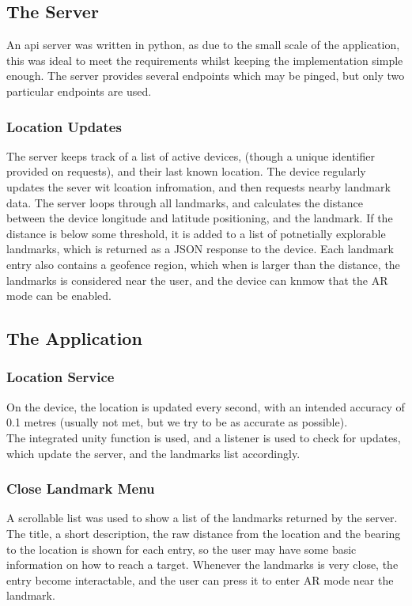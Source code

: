 
\subsection{The Server}
An api server was written in python, as due to the small scale of the application, this was ideal to meet the requirements whilst keeping the 
implementation simple enough. The server provides several endpoints which may be pinged, but only two particular endpoints are used. 
\subsubsection{Location Updates}
The server keeps track of a list of active devices, (though a unique identifier provided on requests), and their last known location.
The device regularly updates the sever wit lcoation infromation, and then requests nearby landmark data. 
The server loops through all landmarks, and calculates the distance between the device longitude and latitude positioning, and the landmark.
If the distance is below some threshold, it is added to a list of potnetially explorable landmarks, which is returned as a JSON response 
to the device. Each landmark entry also contains a geofence region, which when is larger than the distance, the landmarks is considered near 
the user, and the device can knmow that the AR mode can be enabled.
\subsection{The Application}
\subsubsection{Location Service}
On the device, the location is updated every second, with an intended accuracy of 0.1 metres 
(usually not met, but we try to be as accurate as possible).\\
The integrated unity function is used, and a listener is used to check for updates, which update the server,
and the landmarks list accordingly.
\subsubsection{Close Landmark Menu}
A scrollable list was used to show a list of the landmarks returned by the server. The title,
a short description, the raw distance from the location and the bearing to the location is shown for each entry,
 so the user may have some basic information on how to reach a target.
  Whenever the landmarks is very close, the entry become interactable, and the user can press it 
to enter AR mode near the landmark. 
